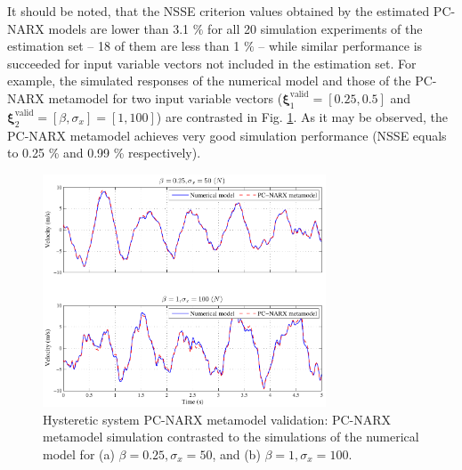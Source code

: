 \documentclass[preprint,3p,review,times,11pt]{elsarticle}
\newcommand{\bld}[1]{\boldsymbol{#1}}
\newcommand{\bxi}{\bld{\xi}}
\begin{document}
 
It should be noted, that the NSSE criterion values obtained by the estimated PC-NARX models are lower than 3.1 $\%$ for all 20 simulation experiments of the estimation set -- 18 of them are less than 1 $\%$ -- while similar performance is succeeded for input variable vectors not included in the estimation set. For example, the simulated responses of the numerical model and those of the PC-NARX metamodel for two input variable vectors ($\bxi_{1}^{\text{valid}} = [0.25, 0.5]$ and $\bxi_{2}^{\text{valid}} = [\beta, \sigma_x] = [1, 100]$) are contrasted in Fig. \ref{fig:boucwen_validation}. As it may be observed, the PC-NARX metamodel achieves very good simulation performance (NSSE equals to 0.25 \% and 0.99 \% respectively).


\begin{figure}[t!]
\begin{center}
\includegraphics[width = 0.75\textwidth]{figs/boucwen_randexci_val.pdf}
\caption{Hysteretic system PC-NARX metamodel validation: PC-NARX metamodel simulation contrasted to the simulations of the numerical model for (a) $ \beta = 0.25,\sigma_x = 50$, and (b) $ \beta = 1,\sigma_x = 100$. 
\label{fig:boucwen_validation}}
\end{center}
\end{figure}





\end{document}
